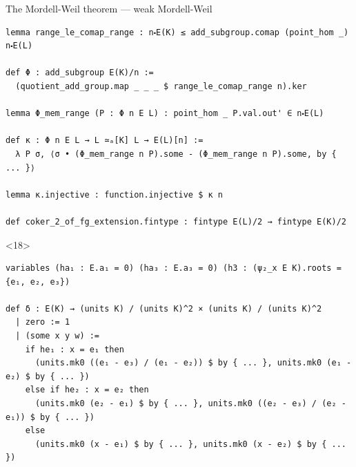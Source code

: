 \documentclass[10pt]{beamer}
\begin{document}
\begin{frame}[fragile, t]{The Mordell-Weil theorem --- weak Mordell-Weil}
\begin{onlyenv}
\begin{lstlisting}[basicstyle=\scriptsize, frame=single]
lemma range_le_comap_range : n⬝E(K) ≤ add_subgroup.comap (point_hom _) n⬝E(L)

def Φ : add_subgroup E(K)/n :=
  (quotient_add_group.map _ _ _ $ range_le_comap_range n).ker

lemma Φ_mem_range (P : Φ n E L) : point_hom _ P.val.out' ∈ n⬝E(L)

def κ : Φ n E L → L ≃ₐ[K] L → E(L)[n] :=
  λ P σ, ⟨σ • (Φ_mem_range n P).some - (Φ_mem_range n P).some, by { ... }⟩

lemma κ.injective : function.injective $ κ n

def coker_2_of_fg_extension.fintype : fintype E(L)/2 → fintype E(K)/2
\end{lstlisting}
\end{onlyenv}


\begin{onlyenv}<18>
\begin{lstlisting}[basicstyle=\scriptsize, frame=single]
variables (ha₁ : E.a₁ = 0) (ha₃ : E.a₃ = 0) (h3 : (ψ₂_x E K).roots = {e₁, e₂, e₃})

def δ : E(K) → (units K) / (units K)^2 × (units K) / (units K)^2
  | zero := 1
  | (some x y w) :=
    if he₁ : x = e₁ then
      (units.mk0 ((e₁ - e₃) / (e₁ - e₂)) $ by { ... }, units.mk0 (e₁ - e₂) $ by { ... })
    else if he₂ : x = e₂ then
      (units.mk0 (e₂ - e₁) $ by { ... }, units.mk0 ((e₂ - e₃) / (e₂ - e₁)) $ by { ... })
    else
      (units.mk0 (x - e₁) $ by { ... }, units.mk0 (x - e₂) $ by { ... })
\end{lstlisting}
\end{onlyenv}


\end{frame}
\end{document}
